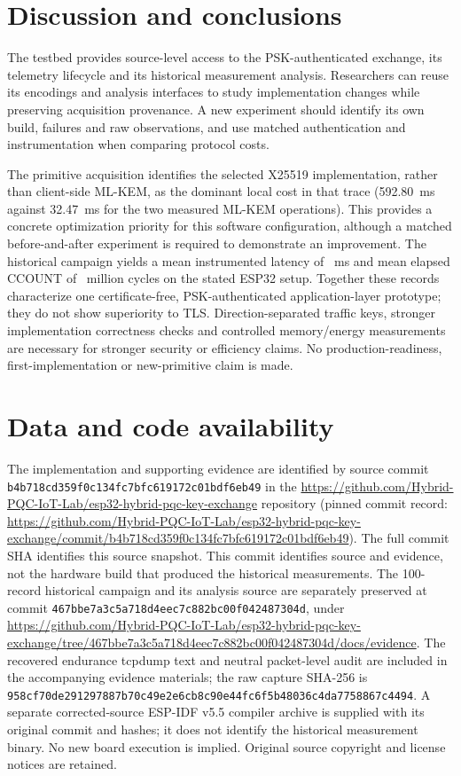 \documentclass[pdflatex,sn-mathphys-num]{sn-jnl}
\newcommand{\ArtifactCommit}{b4b718cd359f0c134fc7bfc619172c01bdf6eb49}%
\newcommand{\ArtifactRepository}{https://github.com/Hybrid-PQC-IoT-Lab/esp32-hybrid-pqc-key-exchange}%
\newcommand{\ArtifactRelease}{https://github.com/Hybrid-PQC-IoT-Lab/esp32-hybrid-pqc-key-exchange/commit/b4b718cd359f0c134fc7bfc619172c01bdf6eb49}%
\begin{document}
\section{Discussion and conclusions}
The testbed provides source-level access to the PSK-authenticated exchange, its telemetry lifecycle and its historical measurement analysis. Researchers can reuse its encodings and analysis interfaces to study implementation changes while preserving acquisition provenance. A new experiment should identify its own build, failures and raw observations, and use matched authentication and instrumentation when comparing protocol costs.

The primitive acquisition identifies the selected X25519 implementation, rather than client-side ML-KEM, as the dominant local cost in that trace (592.80~ms against 32.47~ms for the two measured ML-KEM operations). This provides a concrete optimization priority for this software configuration, although a matched before-and-after experiment is required to demonstrate an improvement. The historical campaign yields a mean instrumented latency of \BenchmarkMeanMs~ms and mean elapsed CCOUNT of \BenchmarkCyclesM~million cycles on the stated ESP32 setup. Together these records characterize one certificate-free, PSK-authenticated application-layer prototype; they do not show superiority to TLS. Direction-separated traffic keys, stronger implementation correctness checks and controlled memory/energy measurements are necessary for stronger security or efficiency claims. No production-readiness, first-implementation or new-primitive claim is made.

\section{Data and code availability}\label{sec:availability}
The implementation and supporting evidence are identified by source commit \nolinkurl{\ArtifactCommit} in the \url{\ArtifactRepository} repository (pinned commit record: \url{\ArtifactRelease}). The full commit SHA identifies this source snapshot. This commit identifies source and evidence, not the hardware build that produced the historical measurements. The 100-record historical campaign and its analysis source are separately preserved at commit \nolinkurl{467bbe7a3c5a718d4eec7c882bc00f042487304d}, under \url{https://github.com/Hybrid-PQC-IoT-Lab/esp32-hybrid-pqc-key-exchange/tree/467bbe7a3c5a718d4eec7c882bc00f042487304d/docs/evidence}. The recovered endurance tcpdump text and neutral packet-level audit are included in the accompanying evidence materials; the raw capture SHA-256 is \texttt{958cf70de291297887b70c49e2e6cb8c90e44fc6f5b48036c4da7758867c4494}. A separate corrected-source ESP-IDF v5.5 compiler archive is supplied with its original commit and hashes; it does not identify the historical measurement binary. No new board execution is implied. Original source copyright and license notices are retained.
\end{document}
